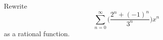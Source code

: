 Rewrite
\[
\sum_{n=0}^\infty \biggl( \frac{2^n + (-1)^n}{3^n}  \biggr) x^n
\]
as a rational function.
